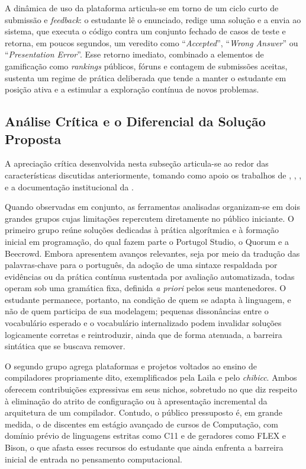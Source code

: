 A dinâmica de uso da plataforma articula-se em torno de um ciclo curto de submissão e \textit{feedback}: o estudante lê o enunciado, redige uma solução e a envia ao sistema, que executa o código contra um conjunto fechado de casos de teste e retorna, em poucos segundos, um veredito como ``\textit{Accepted}'', ``\textit{Wrong Answer}'' ou ``\textit{Presentation Error}''. Esse retorno imediato, combinado a elementos de gamificação como \textit{rankings} públicos, fóruns e contagem de submissões aceitas, sustenta um regime de prática deliberada que tende a manter o estudante em posição ativa e a estimular a exploração contínua de novos problemas.

\subsection{Análise Crítica e o Diferencial da Solução Proposta}

A apreciação crítica desenvolvida nesta subseção articula-se ao redor das características discutidas anteriormente, tomando como apoio os trabalhos de , , ,  e a documentação institucional da .

Quando observadas em conjunto, as ferramentas analisadas organizam-se em dois grandes grupos cujas limitações repercutem diretamente no público iniciante. O primeiro grupo reúne soluções dedicadas à prática algorítmica e à formação inicial em programação, do qual fazem parte o Portugol Studio, o Quorum e a Beecrowd. Embora apresentem avanços relevantes, seja por meio da tradução das palavras-chave para o português, da adoção de uma sintaxe respaldada por evidências ou da prática contínua sustentada por avaliação automatizada, todas operam sob uma gramática fixa, definida \textit{a priori} pelos seus mantenedores. O estudante permanece, portanto, na condição de quem se adapta à linguagem, e não de quem participa de sua modelagem; pequenas dissonâncias entre o vocabulário esperado e o vocabulário internalizado podem invalidar soluções logicamente corretas e reintroduzir, ainda que de forma atenuada, a barreira sintática que se buscava remover.

O segundo grupo agrega plataformas e projetos voltados ao ensino de compiladores propriamente dito, exemplificados pela Laila e pelo \textit{chibicc}. Ambos oferecem contribuições expressivas em seus nichos, sobretudo no que diz respeito à eliminação do atrito de configuração ou à apresentação incremental da arquitetura de um compilador. Contudo, o público pressuposto é, em grande medida, o de discentes em estágio avançado de cursos de Computação, com domínio prévio de linguagens estritas como C11 e de geradores como FLEX e Bison, o que afasta esses recursos do estudante que ainda enfrenta a barreira inicial de entrada no pensamento computacional.

